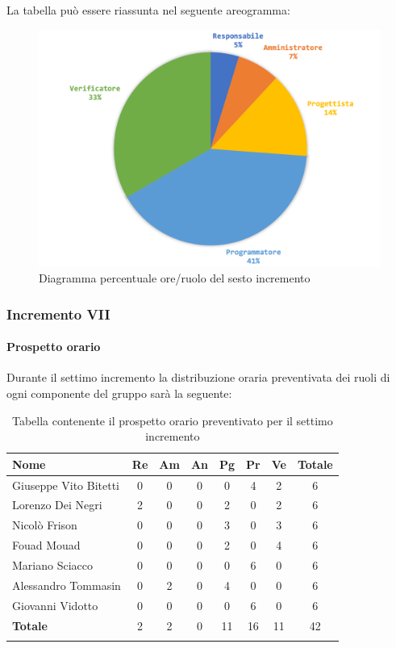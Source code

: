 			La tabella può essere riassunta nel seguente areogramma:
			\begin{figure}[H]
				\centering
				\includegraphics[width=0.8\linewidth]{./images/preventivo/incremento6-2.png}
				\caption{Diagramma percentuale ore/ruolo del sesto incremento}
				\label{fig:diagramma costi ruolo incremento VI}
			\end{figure}
		\pagebreak
			
			
		\subsubsection{Incremento VII}
			\paragraph{Prospetto orario}
			Durante il settimo incremento la distribuzione oraria preventivata dei ruoli di ogni componente del gruppo sarà la seguente:
			
			\begin{longtable}{|l|c|c|c|c|c|c|c|}
				\hline
				\rowcolor{lighter-grayer}
				\textbf{Nome} & \textbf{Re} & \textbf{Am} & \textbf{An} & \textbf{Pg}  & \textbf{Pr}   & \textbf{Ve} & \textbf{Totale} \\
				\hline
				\endfirsthead
				
				\hline
				Giuseppe Vito Bitetti 		 & 0 & 0 & 0 & 0 & 4 & 2 & 6\\
				\hline
				\hline
				Lorenzo Dei Negri			 & 2 & 0 & 0 & 2 & 0 & 2 & 6\\
				\hline
				\hline
				Nicolò Frison				      & 0 & 0 & 0 & 3 & 0 & 3 & 6\\
				\hline
				\hline
				Fouad Mouad 				   & 0 & 0 & 0 & 2 & 0 & 4 & 6\\
				\hline
				\hline
				Mariano Sciacco 			 & 0 & 0 & 0 & 0 & 6 & 0 & 6\\
				\hline
				\hline
				Alessandro Tommasin    & 0 & 2 & 0 & 4 & 0 & 0 & 6\\
				\hline
				\hline
				Giovanni Vidotto 			  & 0 & 0 & 0 & 0 & 6 & 0 & 6\\
				\hline 
				\textbf{Totale}			 		& 2 & 2 & 0 & 11 & 16 & 11 & 42\\
				\hline
				\caption{Tabella contenente il prospetto orario preventivato per il settimo incremento}
			\end{longtable}
			
